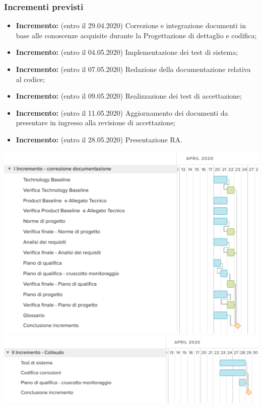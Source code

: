 \subsubsection{Incrementi previsti}
\begin{itemize}
	\item \textbf{ Incremento:} (entro il 29.04.2020) Correzione e integrazione documenti in base alle conoscenze acquisite durante la Progettazione di dettaglio e codifica;
	\item \textbf{ Incremento:} (entro il 04.05.2020) Implementazione dei test di sistema;
	\item \textbf{ Incremento:} (entro il 07.05.2020) Redazione della documentazione relativa al codice;
	\item \textbf{ Incremento:} (entro il 09.05.2020) Realizzazione dei test di accettazione;
	\item \textbf{ Incremento:} (entro il 11.05.2020) Aggiornamento dei documenti da presentare in ingresso alla revisione di accettazione;
	\item \textbf{ Incremento:} (entro il 28.05.2020) Presentazione RA.
\end{itemize}
	\includegraphics[width=\textwidth]{res/img/gantt/RA/1}
	\includegraphics[width=\textwidth]{res/img/gantt/RA/2}
